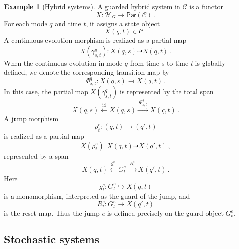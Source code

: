 \documentclass[a4paper,reqno,oneside]{amsart}
\theoremstyle{definition}
\newtheorem{example}[theorem]{Example}
\theoremstyle{remark}
\newcommand{\id}{\mathrm{id}}
\numberwithin{equation}{section}
\begin{document}
\begin{example}[Hybrid systems]
		A guarded hybrid system in $\mathcal C$ is a functor
		\begin{equation}
			X\colon \mathcal H_G\longrightarrow \mathsf{Par}(\mathcal C) \ .
		\end{equation}
		For each mode $q$ and time $t$, it assigns a state object
		\begin{equation}
			X(q,t)\in \mathcal C \ .
		\end{equation}
		A continuous-evolution morphism is realized as a partial map
		\begin{equation}
			X(\gamma^q_{s,t})\colon X(q,s)\dashrightarrow X(q,t) \ .
		\end{equation}
		When the continuous evolution in mode $q$ from time $s$ to time $t$ is
		globally defined, we denote the corresponding transition map by
		\begin{equation}
			\Phi^q_{s,t}\colon X(q,s)\longrightarrow X(q,t) \ .
		\end{equation}
		In this case, the partial map $X(\gamma^q_{s,t})$ is represented by the
		total span
		\begin{equation}
			X(q,s)
			\xleftarrow{\;\id\;}
			X(q,s)
			\xrightarrow{\;\Phi^q_{s,t}\;}
			X(q,t) \ .
		\end{equation}
		A jump morphism
		\begin{equation}
			\rho^e_t\colon (q,t)\longrightarrow (q',t)
		\end{equation}
		is realized as a partial map
		\begin{equation}
			X(\rho^e_t)\colon X(q,t)\dashrightarrow X(q',t) \ ,
		\end{equation}
		represented by a span
		\begin{equation}
			X(q,t)
			\xleftarrow{\;g^e_t\;}
			G^e_t
			\xrightarrow{\;R^e_t\;}
			X(q',t) \ .
		\end{equation}
		Here
		\begin{equation}
			g^e_t\colon G^e_t\hookrightarrow X(q,t)
		\end{equation}
		is a monomorphism, interpreted as the guard of the jump, and
		\begin{equation}
			R^e_t\colon G^e_t\longrightarrow X(q',t)
		\end{equation}
		is the reset map. Thus the jump $e$ is defined precisely on the guard object $G^e_t$.
	\end{example}
	
	
	
	
	
	\subsection{Stochastic systems}\label{sec: stochastic models}
	
\end{document}

